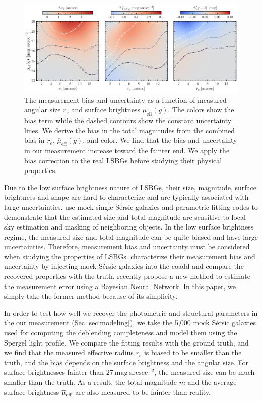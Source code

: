 \documentclass[twocolumn,astrosymb,twocolappendix]{aastex631}
\newcommand{\sbunit}{\mathrm{mag\ arcsec}^{-2}}
\newcommand{\sbeff}{\overline{\mu}_{\mathrm{eff}}(g)}
\newcommand{\sersic}{S\'ersic}
\begin{document}
\begin{CJK*}{UTF8}{gbsn}
\begin{figure}
	\vbox{ 
		\centering
		\includegraphics[width=1\linewidth]{meas_error_spergel.pdf}
	}
    \caption{The measurement bias and uncertainty as a function of measured angular size $r_e$ and surface brightness $\sbeff$. The colors show the bias term while the dashed contours show the constant uncertainty lines. We derive the bias in the total magnitudes from the combined bias in $r_e$, $\sbeff$, and color. We find that the bias and uncertainty in our measurement increase toward the fainter end. We apply the bias correction to the real LSBGs before studying their physical properties.}
    \label{fig:meas_err}
\end{figure}


Due to the low surface brightness nature of LSBGs, their size, magnitude, surface brightness and shape are hard to characterize and are typically associated with large uncertainties. \citet{Haussler2007} use mock single-\sersic{} galaxies and parametric fitting codes to demonstrate that the estimated size and total magnitude are sensitive to local sky estimation and masking of neighboring objects. In the low surface brightness regime, the measured size and total magnitude can be quite biased and have large uncertainties. Therefore, measurement bias and uncertainty must be considered when studying the properties of LSBGs. \citet{Zaritsky2021,Zaritsky2022} characterize their measurement bias and uncertainty by injecting mock \sersic{} galaxies into the coadd and compare the recovered properties with the truth. \citet{Tanoglidis2022ICML} recently propose a new method to estimate the measurement error using a Bayesian Neural Network. In this paper, we simply take the former method because of its simplicity. 

In order to test how well we recover the photometric and structural parameters in the our measurement (Sec \ref{sec:modeling}), we take the 5,000 mock \sersic{} galaxies used for computing the deblending completeness and model them using the Spergel light profile. We compare the fitting results with the ground truth, and we find that the measured effective radius $r_e$ is biased to be smaller than the truth, and the bias depends on the surface brightness and the angular size. For surface brightnesses fainter than $27\ \sbunit$, the measured size can be much smaller than the truth. As a result, the total magnitude $m$ and the average surface brightness $\overline{\mu}_{\rm eff}$ are also measured to be fainter than reality. 


\end{CJK*}
\end{document}
